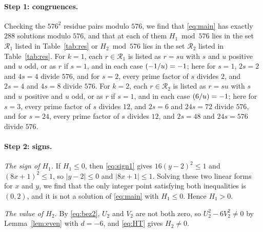 \documentclass[11pt]{article}
\newcommand{\leg}[2]{\mathchoice{\biggl(\dfrac{#1}{#2}\biggr)}{(#1/#2)}{(#1/#2)}{(#1/#2)}}
\begin{document}
\paragraph{Step 1: congruences.} Checking the $576^2$ residue pairs modulo $576$, we find that \eqref{eq:main} has exactly 288 solutions modulo $576$, and that at each of them $H_{1}\bmod 576$ lies in the set $\mathcal R_{1}$ listed in Table~\ref{tab:res} or $H_{2}\bmod 576$ lies in the set $\mathcal R_{2}$ listed in Table~\ref{tab:res}. For $k=1$, each $r\in\mathcal R_{1}$ is listed as $r=su$ with $s$ and $u$ positive and $u$ odd, or as $r$ if $s=1$, and in each case $\leg{-1}{u}=-1$; here for $s=1$, $2s=2$ and $4s=4$ divide $576$, and for $s=2$, every prime factor of $s$ divides $2$, and $2s=4$ and $4s=8$ divide $576$. For $k=2$, each $r\in\mathcal R_{2}$ is listed as $r=su$ with $s$ and $u$ positive and $u$ odd, or as $r$ if $s=1$, and in each case $\leg{6}{u}=-1$; here for $s=3$, every prime factor of $s$ divides $12$, and $2s=6$ and $24s=72$ divide $576$, and for $s=24$, every prime factor of $s$ divides $12$, and $2s=48$ and $24s=576$ divide $576$.

\paragraph{Step 2: signs.} \emph{The sign of $H_{1}$.} If $H_{1}\leq0$, then \eqref{eq:sign1} gives $16(y-2)^2\leq 1$ and $(8x+1)^2\leq 1$, so $|y-2|\leq0$ and $|8x+1|\leq1$. Solving these two linear forms for $x$ and $y$, we find that the only integer point satisfying both inequalities is $(0,2)$, and it is not a solution of \eqref{eq:main} with $H_{1}\leq0$. Hence $H_{1}>0$.

\emph{The value of $H_{2}$.} By \eqref{eq:bez2}, $U_{2}$ and $V_{2}$ are not both zero, so $U_{2}^2-6V_{2}^2\neq0$ by Lemma~\ref{lem:even} with $d=-6$, and \eqref{eq:HT} gives $H_{2}\neq0$.
\end{document}
